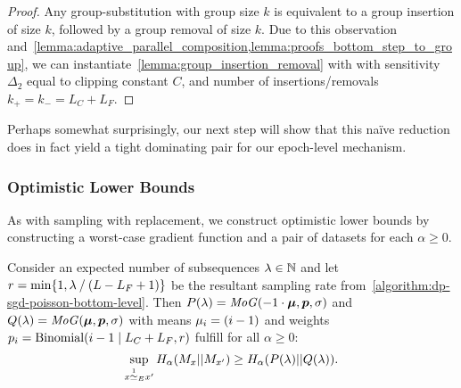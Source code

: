 \begin{proof}
    Any group-substitution with group size $k$ is equivalent
    to a group insertion of size $k$, followed by a group removal of size $k$.
    Due to this observation and~\cref{lemma:adaptive_parallel_composition,lemma:proofs_bottom_step_to_group},
    we can instantiate~\cref{lemma:group_insertion_removal}
    with
    with sensitivity $\Delta_2$ equal to clipping constant $C$,
    and number of insertions/removals $k_+ = k_- = L_C + L_F$.
\end{proof}
Perhaps somewhat surprisingly, our next step will show that this na\"ive reduction does in fact yield a tight dominating pair for our epoch-level mechanism.

\subsubsection{Optimistic Lower Bounds}
As with sampling with replacement, we construct optimistic lower bounds by constructing a worst-case gradient function and a pair of datasets 
for each $\alpha \geq 0$.
\begin{lemma}\label{lemma:deterministic_top_level_poisson_lower}
    Consider an expected number of subsequences $\lambda \in \mathbb{N}$ and let $r = \min\{1, \lambda \mathbin{/} (L - L_F + 1)\}$ be the resultant sampling rate from~\cref{algorithm:dp-sgd-poisson-bottom-level}.
    Then 
    $P(\lambda) = \mathit{MoG}(-1 \cdot {\bm{\mu}}, {\bm{p}}, \sigma)$ and 
    $Q(\lambda) = \mathit{MoG}({\bm{\mu}}, {\bm{p}}, \sigma)$ with
    means ${\mu}_i = (i - 1)$ and 
    weights ${p}_i = \mathrm{Binomial}(i - 1 \mid L_C + L_F, r)$
    fulfill  for all $\alpha \geq 0$: 
    \begin{equation}
        \sup_{x \overset{1}{\simeq}_{E} x'} H_\alpha(M_x || M_{x'}) \geq  H_\alpha(P(\lambda) || Q(\lambda)).
    \end{equation}
\end{lemma}
